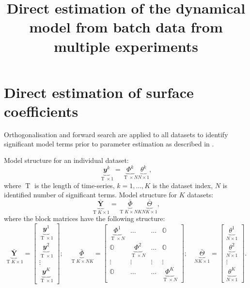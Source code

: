 \documentclass[a4paper,11pt,twoside]{article}
\title{Direct estimation of the dynamical model from batch data from multiple experiments}
\DeclareMathOperator{\zeros}{\mathbb{O}}
\DeclareMathOperator{\T}{\mathrm{T}}
\theoremstyle{mytheoremstyle}
\begin{document}
	\maketitle
\section{Direct estimation of surface coefficients}
\par Orthogonalisation and forward search are applied to all datasets to identify significant model terms prior to parameter estimation as described in \cite{Wei2008}.\\
\par Model structure for an individual dataset:
\begin{equation}
\underbrace{\mathbfit{y}^k}_{\T\times 1} = \underbrace{\Phi^k}_{\T \times N} \underbrace{\theta^k}_{N \times 1},
\end{equation}
where $\T$ is the length of time-series, $k = 1,\dots, K$ is the dataset index, $N$ is identified number of significant terms.
Model structure for $K$ datasets:
\begin{equation}\label{eq:batchtimeser}
\underbrace{\bar{\mathbf{Y}}}_{\T K\times 1} = \underbrace{\bar{\Phi}}_{\T K \times NK} \underbrace{\bar{\Theta}}_{NK \times 1},
\end{equation}
where the block matrices have the following structure:
\begin{equation}
\underbrace{\bar{\mathbf{Y}}}_{\T K\times 1} = \left[\begin{array}{c} 
\underbrace{\mathbfit{y}^1}_{\T\times 1} \\
\underbrace{\mathbfit{y}^2}_{\T\times 1} \\
\vdots \\
\underbrace{\mathbfit{y}^K}_{\T\times 1}
\end{array}\right]; \quad 
\underbrace{\bar{\Phi}}_{\T K \times NK} = \left[\begin{array}{cccc} 
\underbrace{\Phi^1}_{\T \times N} & \dots & \dots & \zeros \\
\zeros & \underbrace{\Phi^2}_{\T \times N} & \dots & \zeros \\
\vdots & \vdots & \vdots & \vdots  \\
\zeros & \dots & \dots & \underbrace{\Phi^K}_{\T \times N}
\end{array}\right]; \quad 
\underbrace{\bar{\Theta}}_{NK \times 1} = \left[\begin{array}{c} 
\underbrace{\theta^1}_{N \times 1} \\
\underbrace{\theta^2}_{N \times 1} \\
\vdots \\
\underbrace{\theta^K}_{N \times 1}
\end{array}\right].
\end{equation}
\end{document}
